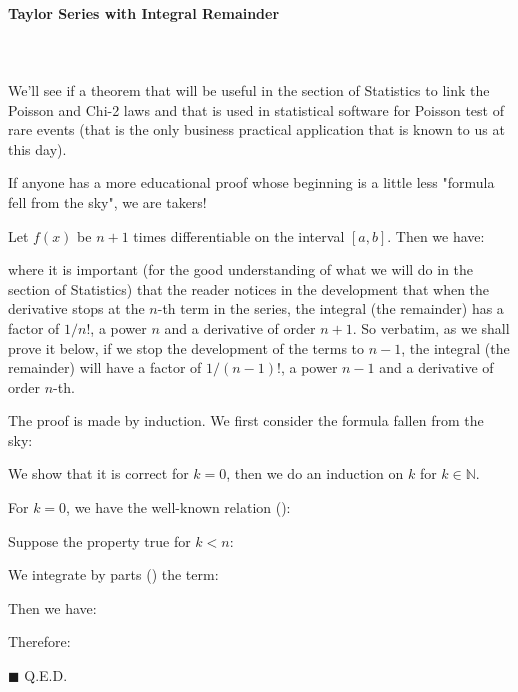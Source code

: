 	\paragraph{Taylor Series with Integral Remainder}\mbox{}\\\\
	We'll see if a theorem that will be useful in the section of Statistics to link the Poisson and Chi-2 laws and that is used in statistical software for Poisson test of rare events (that is the only business practical application that is known to us at this day).
	\begin{tcolorbox}[title=Remark,colframe=black,arc=10pt]
	If anyone has a more educational proof whose beginning is a little less "formula fell from the sky", we are takers!
	\end{tcolorbox}
	\begin{theorem}
	Let $f(x)$ be $n + 1$ times differentiable on the interval $[a, b]$. Then we have:
	
	where it is important (for the good understanding of what we will do in the section of Statistics) that the reader notices in the development that when the derivative stops at the $n$-th term in the series, the integral (the remainder) has a factor of $1 / n !$, a power $n$ and a derivative of order $n + 1$. So verbatim, as we shall prove it below, if we stop the development of the terms to $n-1$, the integral (the remainder) will have a factor of $1 / (n-1) !$, a power $n-1$ and a derivative of order $n$-th.
	\end{theorem}
	\begin{dem}
	The proof is made by induction. We first consider the formula fallen from the sky:
	
	We show that it is correct for $k = 0$, then we do an induction on $k$ for $k\in \mathbb{N}$.
	
	For $k = 0$, we have the well-known relation ():
	
	Suppose the property true for $k<n$:
	
	We integrate by parts () the term:
	
	Then we have:
	
	Therefore:
	
	\begin{flushright}
		$\blacksquare$  Q.E.D.
	\end{flushright}
	\end{dem}
	
